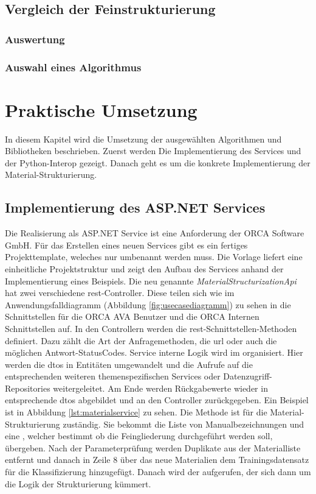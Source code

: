 \section{Vergleich der Feinstrukturierung}
\label{c:comparison:fine-structuring}
\subsection{Auswertung}
\label{c:comparison:fine-structuring:evaluation}
\subsection{Auswahl eines Algorithmus}
\label{c:comparison:fine-structuring:selection}


\chapter{Praktische Umsetzung}
\label{c:implementation}
In diesem Kapitel wird die Umsetzung der ausgewählten Algorithmen und Bibliotheken beschrieben. Zuerst werden Die Implementierung des Services und der Python-Interop gezeigt. Danach geht es um die konkrete Implementierung der Material-Strukturierung.

\section{Implementierung des ASP.NET Services}
\label{c:implementation:service}
Die Realisierung als ASP.NET Service ist eine Anforderung der \glqq ORCA Software GmbH\grqq{}. Für das Erstellen eines neuen Services gibt es ein fertiges Projekttemplate, weleches nur umbenannt werden muss. Die Vorlage liefert eine einheitliche Projektstruktur und zeigt den Aufbau des Services anhand der Implementierung eines Beispiels. Die neu genannte \textit{ MaterialStructurizationApi} hat zwei verschiedene \ac{rest}-Controller.
Diese teilen sich wie im Anwendungsfalldiagramm (Abbildung \ref{fig:usecasediagramm}) zu sehen in die Schnittstellen für die ORCA AVA Benutzer und die ORCA Internen Schnittstellen auf. In den Controllern werden die \ac{rest}-Schnittstellen-Methoden definiert. Dazu zählt die Art der Anfragemethoden, die \ac{url} oder auch die möglichen Antwort-StatusCodes. Service interne Logik wird im  organisiert. Hier werden die \acp{dto} in Entitäten umgewandelt und die Aufrufe auf die entsprechenden weiteren themenspezifischen Services oder Datenzugriff-Repositories weitergeleitet. Am Ende werden Rückgabewerte wieder in entsprechende \acp{dto} abgebildet und an den Controller zurückgegeben. Ein Beispiel ist in Abbildung \ref{lst:materialservice} zu sehen. Die Methode ist für die Material-Strukturierung zuständig. Sie bekommt die Liste von Manualbezeichnungen und eine , welcher bestimmt ob die Feingliederung durchgeführt werden soll, übergeben. Nach der Parameterprüfung werden Duplikate aus der Materialliste entfernt und danach in Zeile 8 über das  neue Materialien dem Trainingsdatensatz für die Klassifizierung hinzugefügt. Danach wird der  aufgerufen, der sich dann um die Logik der Strukturierung kümmert.

